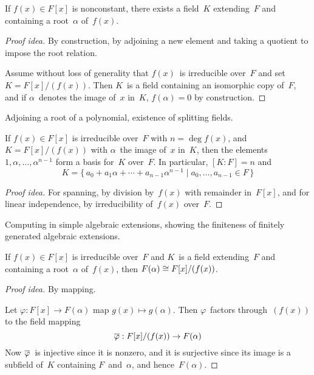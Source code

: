 \begin{thm}
If \(f(x)\in F[x]\) is nonconstant, there exists a field~\(K\) extending~\(F\) and containing a root~\(\alpha\) of~\(f(x)\).
\end{thm}
\begin{proof}[Proof idea]
By construction, by adjoining a new element and taking a quotient to impose the root relation. 

Assume without loss of generality that \(f(x)\)~is irreducible over~\(F\) and set \(K=F[x]/(f(x))\). Then \(K\)~is a field containing an isomorphic copy of~\(F\), and if \(\alpha\)~denotes the image of~\(x\) in~\(K\), \(f(\alpha)=0\) by construction.
\end{proof}
\begin{app}
Adjoining a root of a polynomial, existence of splitting fields.
\end{app}

\begin{thm}
If \(f(x)\in F[x]\) is irreducible over~\(F\) with \(n=\deg f(x)\), and \(K=F[x]/(f(x))\) with \(\alpha\)~the image of~\(x\) in~\(K\), then the elements \(1,\alpha,\ldots,\alpha^{n-1}\) form a basis for~\(K\) over~\(F\). In particular, \([K:F]=n\) and
\[K=\{\,a_0+a_1\alpha+\cdots+a_{n-1}\alpha^{n-1}\mid a_0,\ldots,a_{n-1}\in F\,\}\]
\end{thm}
\begin{proof}[Proof idea]
For spanning, by division by~\(f(x)\) with remainder in~\(F[x]\), and for linear independence, by irreducibility of~\(f(x)\) over~\(F\).
\end{proof}
\begin{app}
Computing in simple algebraic extensions, showing the finiteness of finitely generated algebraic extensions.
\end{app}

\begin{thm}
If \(f(x)\in F[x]\) is irreducible over~\(F\) and \(K\)~is a field extending~\(F\) and containing a root~\(\alpha\) of~\(f(x)\), then \(F(\alpha)\cong F[x]/(f(x))\).
\end{thm}
\begin{proof}[Proof idea]
By mapping.

Let \(\varphi:F[x]\to F(\alpha)\) map \(g(x)\mapsto g(\alpha)\). Then \(\varphi\)~factors through~\((f(x))\) to the field mapping
\[\overline{\varphi}:F[x]/(f(x))\to F(\alpha)\]
Now \(\overline{\varphi}\)~is injective since it is nonzero, and it is surjective since its image is a subfield of~\(K\) containing \(F\)~and~\(\alpha\), and hence~\(F(\alpha)\).
\end{proof}

